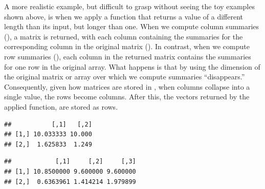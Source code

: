 \documentclass[krantz2]{krantz}\usepackage{knitr}
\begin{document}
A more realistic example, but difficult to grasp without seeing the toy examples shown above, is when we apply a function that returns a value of a different length than its input, but longer than one. When we compute column summaries (), a matrix is returned, with each column containing the summaries for the corresponding column in the original matrix (). In contrast, when we compute row summaries (), each column in the returned matrix contains the summaries for one row in the original array. What happens is that by using  the dimension of the original matrix or array over which we compute summaries ``disappears.'' Consequently, given how matrices are stored in \Rlang, when columns collapse into a single value, the rows become columns. After this, the vectors returned by the applied function, are stored as rows.

\begin{knitrout}\footnotesize
{}\color{fgcolor}\begin{kframe}
\begin{alltt}
 \hlkwb{<-} \hlstd{(}\hlstd{,}  \hlstd{=} \hlstd{) \{}
       \hlstd{(}      
    \hlstd{\}}
\end{alltt}
\end{kframe}
\end{knitrout}

\begin{knitrout}\footnotesize
{}\color{fgcolor}\begin{kframe}
\begin{alltt}
 \hlkwb{<-} \hlstd{(}   \hlstd{=} \hlstd{,}    \hlstd{=} \hlstd{)}
\end{alltt}
\begin{verbatim}
##           [,1]   [,2]
## [1,] 10.033333 10.000
## [2,]  1.625833  1.249
\end{verbatim}
\end{kframe}
\end{knitrout}

\begin{knitrout}\footnotesize
{}\color{fgcolor}\begin{kframe}
\begin{alltt}
 \hlkwb{<-} \hlstd{(}   \hlstd{=} \hlstd{,}    \hlstd{=} \hlstd{)}
\end{alltt}
\begin{verbatim}
##            [,1]     [,2]     [,3]
## [1,] 10.8500000 9.600000 9.600000
## [2,]  0.6363961 1.414214 1.979899
\end{verbatim}
\end{kframe}
\end{knitrout}
\end{document}
